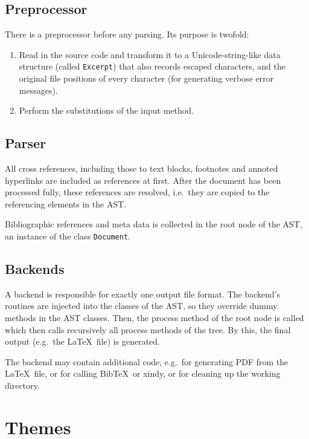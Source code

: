 \documentclass[12pt,openany]{book}
\begin{document}
\subsection{Preprocessor}

There is a preprocessor before any parsing.  Its purpose is twofold:

\begin{enumerate}
\item Read in the source code and transform it to a Unicode-string-like data
  structure (called \lstinline{Excerpt}) that also records escaped characters,
  and the original file positions of every character (for generating verbose
  error messages).
\item Perform the substitutions of the input method.
\end{enumerate}


\subsection{Parser}

All cross references, including those to text blocks, footnotes and annoted
hyperlinks are included as references at first.  After the document has been
processed fully, these references are resolved, i.e.\ they are copied to the
referencing elements in the AST\@.

Bibliographic references and meta data is collected in the root node of the
AST, an instance of the class \lstinline{Document}.


\subsection{Backends}

A backend is responsible for exactly one output file format.  The backend's
routines are injected into the classes of the AST, so they override dummy
methods in the AST classes.  Then, the process method of the root node is
called which then calls recursively all process methods of the tree.  By this,
the final output (e.g.\ the \LaTeX\ file) is generated.

The backend may contain additional code, e.g.\ for generating PDF from the
\LaTeX\ file, or for calling Bib\TeX\ or xindy, or for cleaning up the working
directory.


\section{Themes}
\end{document}
